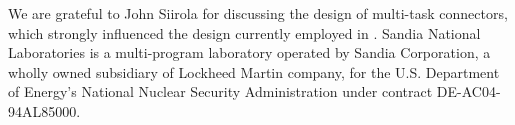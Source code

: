 We are grateful to John Siirola for discussing the design of
multi-task connectors, which strongly influenced the design currently
employed in .  Sandia National Laboratories
is a multi-program laboratory operated by Sandia Corporation, a
wholly owned subsidiary of Lockheed Martin company, for the U.S.
Department of Energy's National Nuclear Security Administration
under contract DE-AC04-94AL85000.
